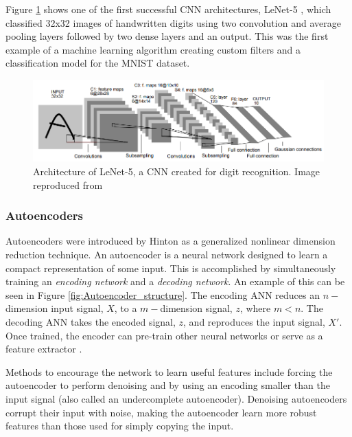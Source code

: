 Figure \ref{fig:cnn_mnist_lecun98} shows one of the first successful CNN architectures, LeNet-5 \cite{Lecun1998}, which classified 32x32 images of handwritten digits using two convolution and average pooling layers followed by two dense layers and an output. This was the first example of a machine learning algorithm creating custom filters and a classification model for the MNIST dataset. 

\begin{figure}[H]
	\centering
	\includegraphics[width=0.85\linewidth]{images/cnn_mnist_lecun98}
	\caption{Architecture of LeNet-5, a CNN created for digit recognition. Image reproduced from \cite{Lecun1998}}
	\label{fig:cnn_mnist_lecun98}
\end{figure}

\subsubsection{Autoencoders} \label{Autoencoders}

Autoencoders were introduced by Hinton \cite{Hinton2006} as a generalized nonlinear dimension reduction technique. An autoencoder is a neural network designed to learn a compact representation of some input. This is accomplished by simultaneously training an \textit{encoding network} and a \textit{decoding network}. An example of this can be seen in Figure \ref{fig:Autoencoder_structure}. The encoding ANN reduces an $n-$dimension input signal, $X$, to a $m-$dimension signal, $z$, where $m < n$. The decoding ANN takes the encoded signal, $z$, and reproduces the input signal, $X'$. Once trained, the encoder can pre-train other neural networks or serve as a feature extractor \cite{Erhan2010,CHARTE2018}. 

Methods to encourage the network to learn useful features include forcing the autoencoder to perform denoising \cite{Vincent2008, Vincent2010} and by using an encoding smaller than the input signal (also called an undercomplete autoencoder). Denoising autoencoders corrupt their input with noise, making the autoencoder learn more robust features than those used for simply copying the input. 

